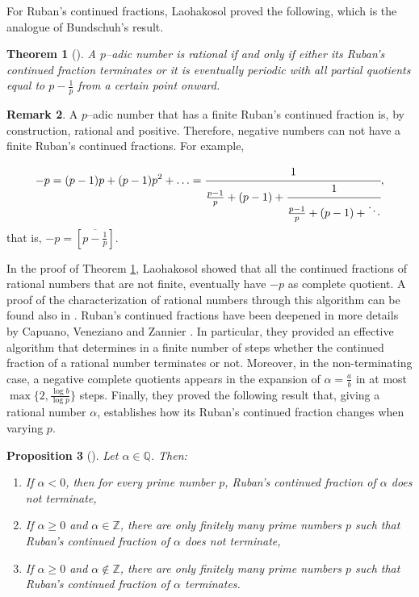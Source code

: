 \documentclass[12pt, reqno]{amsart}
\theoremstyle{plain}
\newtheorem{Theorem}{Theorem}
\newtheorem{Proposition}[Theorem]{Proposition}
\theoremstyle{definition}
\newtheorem{Remark}[Theorem]{Remark}
\begin{document}
For Ruban's continued fractions, Laohakosol \cite{LAO} proved the following, which is the analogue of Bundschuh's result.

\begin{Theorem}[\cite{LAO}]\label{Thm: Lao}
A $p$--adic number is rational if and only if either its Ruban's continued fraction terminates or it is eventually periodic with all partial quotients equal to $p-\frac{1}{p}$ from a certain point onward.
\end{Theorem}

\begin{Remark}
A $p$--adic number that has a finite Ruban's continued fraction is, by construction, rational and positive. Therefore, negative numbers can not have a finite Ruban's continued fractions. For example,

\begin{align*}
-p=(p-1)p+(p-1)p^2+\ldots=\cfrac{1}{\frac{p-1}{p}+(p-1)+\cfrac{1}{\frac{p-1}{p}+(p-1)+\ddots}},    
\end{align*}
that is, $-p=\left[\overline{p-\frac{1}{p}}\right]$.    
\end{Remark}

In the proof of Theorem \ref{Thm: Lao}, Laohakosol showed that all the continued fractions of rational numbers that are not finite, eventually have $-p$ as complete quotient. A proof of the characterization of rational numbers through this algorithm can be found also in \cite{WANG}. Ruban's continued fractions have been deepened in more details by Capuano, Veneziano and Zannier \cite{CVZ}. In particular, they provided an effective algorithm that determines in a finite number of steps whether the continued fraction of a rational number terminates or not. Moreover, in the non-terminating case, a negative complete quotients appears in the expansion of $\alpha=\frac{a}{b}$ in at most $\max\{2,\frac{\log b}{\log p}\}$ steps. Finally, they proved the following result that, giving a rational number $\alpha$, establishes how its Ruban's continued fraction changes when varying $p$.
\begin{Proposition}[\cite{CVZ}]
Let $\alpha\in\mathbb{Q}$. Then:
\begin{enumerate}
    \item[i)] If $\alpha<0$, then for every prime number $p$, Ruban's continued fraction of $\alpha$ does not terminate,
    \item[ii)] If $\alpha\geq 0$ and $\alpha\in\mathbb{Z}$, there are only finitely many prime numbers $p$ such that Ruban's continued fraction of $\alpha$ does not terminate,
    \item[iii)] If $\alpha\geq 0$ and $\alpha\not\in\mathbb{Z}$, there are only finitely many prime numbers $p$ such that Ruban's continued fraction of $\alpha$ terminates.
\end{enumerate}
\end{Proposition}
\end{document}

